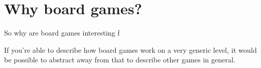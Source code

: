 \section{Why board games?}
So why are board games interesting f

If you're able to describe how board games work on a very generic level, it would be possible to abstract away from that to describe other games in general.

